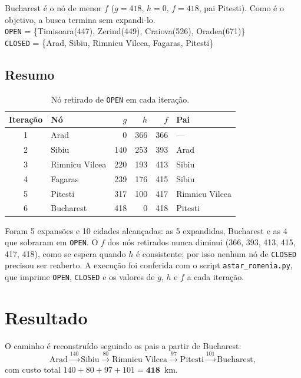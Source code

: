\documentclass[11pt,a4paper]{article}
\begin{document}
Bucharest é o nó de menor $f$ ($g = 418$, $h = 0$, $f = 418$, pai Pitesti). Como é o objetivo, a busca termina sem
expandi-lo.\\
\texttt{OPEN} = \{Timisoara(447), Zerind(449), Craiova(526), Oradea(671)\}\\
\texttt{CLOSED} = \{Arad, Sibiu, Rimnicu Vilcea, Fagaras, Pitesti\}

\subsection*{Resumo}

\begin{table}[h]
  \centering
  \small
  \caption{Nó retirado de \texttt{OPEN} em cada iteração.}
  \label{tab:resumo}
  \begin{tabular}{clrrrl}
    \toprule
    Iteração & Nó & $g$ & $h$ & $f$ & Pai \\
    \midrule
    1 & Arad           &   0 & 366 & 366 & --- \\
    2 & Sibiu          & 140 & 253 & 393 & Arad \\
    3 & Rimnicu Vilcea & 220 & 193 & 413 & Sibiu \\
    4 & Fagaras        & 239 & 176 & 415 & Sibiu \\
    5 & Pitesti        & 317 & 100 & 417 & Rimnicu Vilcea \\
    6 & Bucharest      & 418 &   0 & 418 & Pitesti \\
    \bottomrule
  \end{tabular}
\end{table}

Foram 5 expansões e 10 cidades alcançadas: as 5 expandidas, Bucharest e as 4 que sobraram em \texttt{OPEN}. O $f$ dos
nós retirados nunca diminui (366, 393, 413, 415, 417, 418), como se espera quando $h$ é consistente; por isso nenhum
nó de \texttt{CLOSED} precisou ser reaberto. A execução foi conferida com o script \texttt{astar\_romenia.py}, que
imprime \texttt{OPEN}, \texttt{CLOSED} e os valores de $g$, $h$ e $f$ a cada iteração.

\section{Resultado}

O caminho é reconstruído seguindo os pais a partir de Bucharest:
\[
  \text{Arad} \xrightarrow{140} \text{Sibiu} \xrightarrow{80} \text{Rimnicu Vilcea} \xrightarrow{97} \text{Pitesti}
  \xrightarrow{101} \text{Bucharest},
\]
com custo total $140 + 80 + 97 + 101 = \mathbf{418}$~km.
\end{document}
